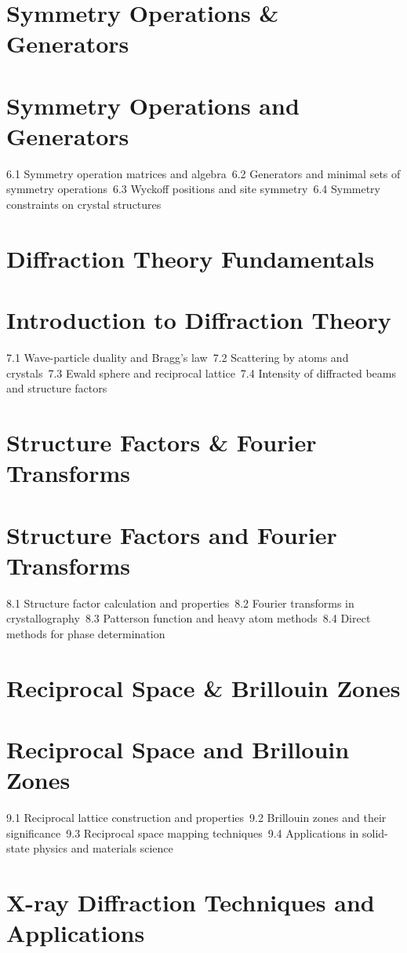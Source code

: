 \section{Symmetry Operations \& Generators}
\section{Symmetry Operations and Generators}
6.1 Symmetry operation matrices and algebra\
6.2 Generators and minimal sets of symmetry operations\
6.3 Wyckoff positions and site symmetry\
6.4 Symmetry constraints on crystal structures\
\section{Diffraction Theory Fundamentals}
\section{Introduction to Diffraction Theory}
7.1 Wave-particle duality and Bragg's law\
7.2 Scattering by atoms and crystals\
7.3 Ewald sphere and reciprocal lattice\
7.4 Intensity of diffracted beams and structure factors\
\section{Structure Factors \& Fourier Transforms}
\section{Structure Factors and Fourier Transforms}
8.1 Structure factor calculation and properties\
8.2 Fourier transforms in crystallography\
8.3 Patterson function and heavy atom methods\
8.4 Direct methods for phase determination\
\section{Reciprocal Space \& Brillouin Zones}
\section{Reciprocal Space and Brillouin Zones}
9.1 Reciprocal lattice construction and properties\
9.2 Brillouin zones and their significance\
9.3 Reciprocal space mapping techniques\
9.4 Applications in solid-state physics and materials science\
\section{X-ray Diffraction Techniques and Applications}
